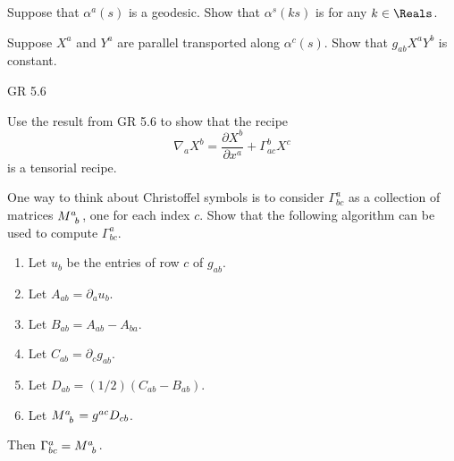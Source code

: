 \documentclass[minion]{homework}
\begin{document}
\begin{aproblems}

\hproblem Suppose that $\alpha^a(s)$ is a geodesic.  Show that
$\alpha^s(ks)$ is for any $k\in\Reals$.

\hproblem Suppose $X^a$ and $Y^a$ are parallel transported
along $\alpha^c(s)$.  Show that $g_{ab} X^a Y^b$ is constant.

\hproblem GR 5.6

\hproblem Use the result from GR 5.6 to show that the recipe
\begin{equation}
\nabla_a X^b = \frac{\partial X^b}{\partial x^a} + \Gamma^b_{ac} X^c
\end{equation}
is a tensorial recipe.

\hproblem  One way to think about Christoffel symbols is to
consider $\Gamma^a_{bc}$ as a collection of matrices $M\indices{^a_b}$,
one for each index $c$.  Show that the following algorithm
can be used to compute $\Gamma^a_{bc}$.
\begin{enumerate}
\item Let $u_b$ be the entries of row $c$ of $g_{ab}$.
\item Let $A_{ab} = \partial_a u_b$.
\item Let $B_{ab} = A_{ab} - A_{ba}$.
\item Let $C_{ab} = \partial_c g_{ab}$.
\item Let $D_{ab} = (1/2)( C_{ab}-B_{ab} )$.
\item Let $M\indices{^a_b} = g^{ac}D_{cb}$.
\end{enumerate}
Then $\Gamma^a_{bc} = M\indices{^a_b}$.

\end{aproblems}
\end{document}
